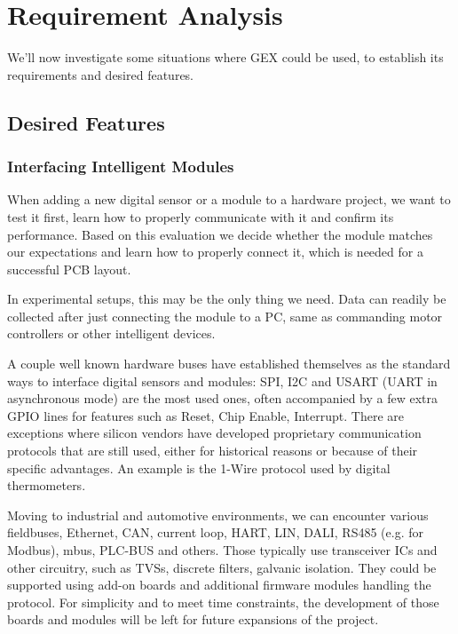 \chapter{Requirement Analysis}

We'll now investigate some situations where GEX could be used, to establish its requirements and desired features.

\section{Desired Features}

\subsection{Interfacing Intelligent Modules}\label{sec:uses-digital-ifaces}

When adding a new digital sensor or a module to a hardware project, we want to test it first, learn how to properly communicate with it and confirm its performance. Based on this evaluation we decide whether the module matches our expectations and learn how to properly connect it, which is needed for a successful \gls{PCB} layout.

In experimental setups, this may be the only thing we need. Data can readily be collected after just connecting the module to a \gls{PC}, same as commanding motor controllers or other intelligent devices.

A couple well known hardware buses have established themselves as the standard ways to interface digital sensors and modules: \gls{SPI}, \gls{I2C} and \gls{USART} (\gls{UART} in asynchronous mode) are the most used ones, often accompanied by a few extra \gls{GPIO} lines for features such as Reset, Chip Enable, Interrupt. There are exceptions where silicon vendors have developed proprietary communication protocols that are still used, either for historical reasons or because of their specific advantages. An example is the 1-Wire protocol used by digital thermometers.

Moving to industrial and automotive environments, we can encounter various fieldbuses, Ethernet, \gls{CAN}, current loop, \gls{HART}, \gls{LIN}, \gls{DALI}, RS485 (e.g. for Modbus), \gls{mbus}, PLC-BUS and others. Those typically use transceiver \glspl{IC} and other circuitry, such as \glspl{TVS}, discrete filters, galvanic isolation. They could be supported using add-on boards and additional firmware modules handling the protocol. For simplicity and to meet time constraints, the development of those boards and modules will be left for future expansions of the project.

